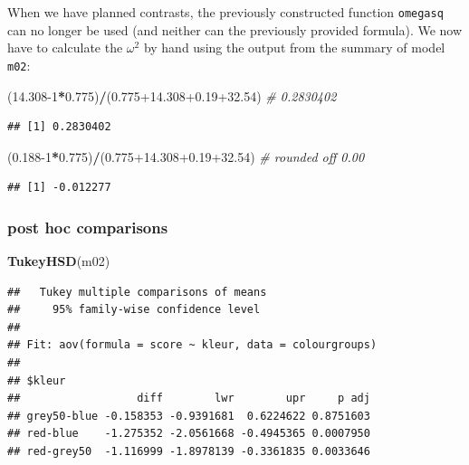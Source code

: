 \documentclass[
]{book}
\newenvironment{Shaded}{\begin{snugshade}}{\end{snugshade}}
\newcommand{\CommentTok}[1]{\textcolor[rgb]{0.56,0.35,0.01}{\textit{#1}}}
\newcommand{\DecValTok}[1]{\textcolor[rgb]{0.00,0.00,0.81}{#1}}
\newcommand{\FloatTok}[1]{\textcolor[rgb]{0.00,0.00,0.81}{#1}}
\newcommand{\FunctionTok}[1]{\textcolor[rgb]{0.13,0.29,0.53}{\textbf{#1}}}
\newcommand{\NormalTok}[1]{#1}
\newcommand{\SpecialCharTok}[1]{\textcolor[rgb]{0.81,0.36,0.00}{\textbf{#1}}}
\begin{document}
When we have planned contrasts, the previously constructed function \texttt{omegasq} can no longer be used (and neither can the previously provided formula). We now have to calculate the \(\omega^2\) by hand using the output from the summary of model \texttt{m02}:

\begin{Shaded}
\begin{Highlighting}[]
\NormalTok{(}\FloatTok{14.308}\DecValTok{{-}1}\SpecialCharTok{*}\FloatTok{0.775}\NormalTok{)}\SpecialCharTok{/}\NormalTok{(}\FloatTok{0.775+14.308+0.19+32.54}\NormalTok{) }\CommentTok{\# 0.2830402}
\end{Highlighting}
\end{Shaded}

\begin{verbatim}
## [1] 0.2830402
\end{verbatim}

\begin{Shaded}
\begin{Highlighting}[]
\NormalTok{(}\FloatTok{0.188}\DecValTok{{-}1}\SpecialCharTok{*}\FloatTok{0.775}\NormalTok{)}\SpecialCharTok{/}\NormalTok{(}\FloatTok{0.775+14.308+0.19+32.54}\NormalTok{) }\CommentTok{\# rounded off 0.00}
\end{Highlighting}
\end{Shaded}

\begin{verbatim}
## [1] -0.012277
\end{verbatim}

\hypertarget{r-post-hoc-comparisons}{%
\subsubsection{post hoc comparisons}\label{r-post-hoc-comparisons}}

\begin{Shaded}
\begin{Highlighting}[]
\FunctionTok{TukeyHSD}\NormalTok{(m02)}
\end{Highlighting}
\end{Shaded}

\begin{verbatim}
##   Tukey multiple comparisons of means
##     95% family-wise confidence level
## 
## Fit: aov(formula = score ~ kleur, data = colourgroups)
## 
## $kleur
##                  diff        lwr        upr     p adj
## grey50-blue -0.158353 -0.9391681  0.6224622 0.8751603
## red-blue    -1.275352 -2.0561668 -0.4945365 0.0007950
## red-grey50  -1.116999 -1.8978139 -0.3361835 0.0033646
\end{verbatim}
\end{document}
